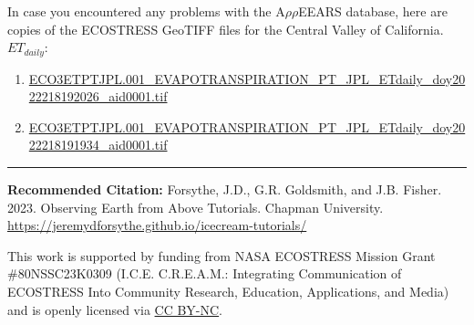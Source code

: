 \documentclass[oneside,a4paper,11pt,explicit]{book}
\begin{document}
\begin{tcolorbox}[colback=yellow!5!white,title=\textbf{Datafiles}]
	\large
	In case you encountered any problems with the A$\rho\rho$EEARS database, here are copies of the ECOSTRESS GeoTIFF files for the Central Valley of California. $ET_{daily}$:
	\begin{enumerate}
		\item \href{https://jeremydforsythe.github.io/icecream-tutorials/Tutorial8_Evapotranspiration/ECO3ETPTJPL.001_EVAPOTRANSPIRATION_PT_JPL_ETdaily_doy2022218192026_aid0001.tif}{\small ECO3ETPTJPL.001\_EVAPOTRANSPIRATION\_PT\_JPL\_ETdaily\_doy2022218192026\_aid0001.tif}
		\item \href{https://jeremydforsythe.github.io/icecream-tutorials/Tutorial8_Evapotranspiration/ECO3ETPTJPL.001_EVAPOTRANSPIRATION_PT_JPL_ETdaily_doy2022218191934_aid0001.tif}{\small ECO3ETPTJPL.001\_EVAPOTRANSPIRATION\_PT\_JPL\_ETdaily\_doy2022218191934\_aid0001.tif}
	\end{enumerate}
\end{tcolorbox}

\vfill

\hrule

\vspace{1em}

\small \textbf{Recommended Citation:} Forsythe, J.D., G.R. Goldsmith, and J.B. Fisher. 2023. Observing Earth from Above Tutorials. Chapman University. \url{https://jeremydforsythe.github.io/icecream-tutorials/}

\vspace{1em}

This work is supported by funding from NASA ECOSTRESS Mission Grant \#80NSSC23K0309 (I.C.E. C.R.E.A.M.: Integrating Communication of ECOSTRESS Into Community Research, Education, Applications, and Media) and is openly licensed via \href{https://creativecommons.org/licenses/by-nc/4.0/}{CC BY-NC}.
\end{document}
